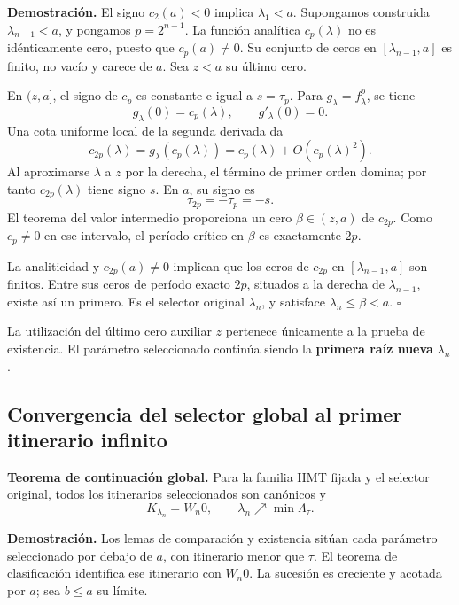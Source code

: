 \textbf{Demostración.} El signo \(c_2(a)<0\) implica \(\lambda_1<a\). Supongamos construida \(\lambda_{n-1}<a\), y pongamos \(p=2^{n-1}\). La función analítica \(c_p(\lambda)\) no es idénticamente cero, puesto que \(c_p(a)\ne0\). Su conjunto de ceros en \([\lambda_{n-1},a]\) es finito, no vacío y carece de \(a\). Sea \(z<a\) su último cero.

En \((z,a]\), el signo de \(c_p\) es constante e igual a \(s=\tau_p\). Para \(g_\lambda=f_\lambda^p\), se tiene
\[
g_\lambda(0)=c_p(\lambda),\qquad g'_\lambda(0)=0.
\]
Una cota uniforme local de la segunda derivada da
\begin{equation}
c_{2p}(\lambda)
=g_\lambda(c_p(\lambda))
=c_p(\lambda)+O(c_p(\lambda)^2).
\label{hmtfg:clasificacion:eq:9}
\end{equation}
Al aproximarse \(\lambda\) a \(z\) por la derecha, el término de primer orden domina; por tanto \(c_{2p}(\lambda)\) tiene signo \(s\). En \(a\), su signo es
\[
\tau_{2p}=-\tau_p=-s.
\]
El teorema del valor intermedio proporciona un cero \(\beta\in(z,a)\) de \(c_{2p}\). Como \(c_p\ne0\) en ese intervalo, el período crítico en \(\beta\) es exactamente \(2p\).

La analiticidad y \(c_{2p}(a)\ne0\) implican que los ceros de \(c_{2p}\) en \([\lambda_{n-1},a]\) son finitos. Entre sus ceros de período exacto \(2p\), situados a la derecha de \(\lambda_{n-1}\), existe así un primero. Es el selector original \(\lambda_n\), y satisface \(\lambda_n\le\beta<a\). \(\square\)

La utilización del último cero auxiliar \(z\) pertenece únicamente a la prueba de existencia. El parámetro seleccionado continúa siendo la \textbf{primera raíz nueva} \(\lambda_n\).


\subsection{Convergencia del selector global al primer itinerario infinito}
\label{hmtfg:clasificacion:5}

\textbf{Teorema de continuación global.} Para la familia HMT fijada y el selector original, todos los itinerarios seleccionados son canónicos y
\begin{equation}
\boxed{K_{\lambda_n}=W_n0,\qquad
\lambda_n\nearrow\min\Lambda_\tau.}
\label{hmtfg:clasificacion:eq:10}
\end{equation}

\textbf{Demostración.} Los lemas de comparación y existencia sitúan cada parámetro seleccionado por debajo de \(a\), con itinerario menor que \(\tau\). El teorema de clasificación identifica ese itinerario con \(W_n0\). La sucesión es creciente y acotada por \(a\); sea \(b\le a\) su límite.

